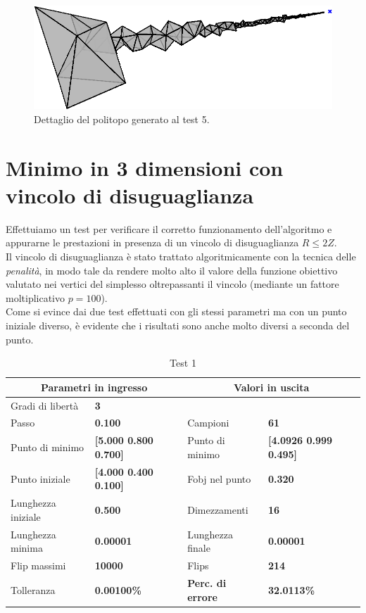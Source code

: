 \documentclass[a4paper, 11pt]{article}
\begin{document}
\begin{figure}[H]
    \centering
        \includegraphics[width=14cm]{assets/figure6}
        \caption{Dettaglio del politopo generato al test 5.}
\end{figure}
\noindent

\newpage
\section{Minimo in 3 dimensioni con vincolo di disuguaglianza}

Effettuiamo un test per verificare il corretto funzionamento dell'algoritmo e
appurarne le prestazioni in presenza di un vincolo di disuguaglianza $R \le 2Z$.
\\
Il vincolo di disuguaglianza è stato trattato algoritmicamente con la tecnica
delle \emph{penalità}, in modo tale da rendere molto alto il valore della
funzione obiettivo valutato nei vertici del simplesso oltrepassanti il vincolo
(mediante un fattore moltiplicativo $p = 100$). \\
Come si evince dai due test effettuati con gli stessi parametri ma con un punto
iniziale diverso, è evidente che i risultati sono anche molto diversi a seconda
del punto.

\begin{table}[h]
    \caption{Test 1}
    \begin{center}
    \begin{tabular}{|l|l|l|l|} 
    \hline 
\multicolumn{2}{|c|}{\textbf{Parametri in ingresso}} &
\multicolumn{2}{c|}{\textbf {Valori in uscita}} \\ \hline
Gradi di libertà  & \textbf{3} &  &  \\ \hline 
Passo & \textbf{0.100} & Campioni & \textbf{61} \\ \hline 
Punto di minimo & \textbf{{[}5.000 0.800 0.700{]}} & Punto di minimo &
\textbf{{[}4.0926 0.999 0.495{]}} \\ \hline 
Punto iniziale & \textbf{{[}4.000 0.400 0.100{]}} & Fobj nel punto &
\textbf{0.320} \\ \hline 
Lunghezza iniziale & \textbf{0.500} & Dimezzamenti & \textbf{16} \\ \hline 
Lunghezza minima & \textbf{0.00001} & Lunghezza finale & \textbf{0.00001} \\
\hline
Flip massimi & \textbf{10000} & Flips & \textbf{214} \\ \hline 
Tolleranza & \textbf{0.00100\%} & \textbf{Perc. di errore} & \textbf{32.0113\%}
\\ \hline 
    \end{tabular}
    \end{center}
    \end{table}
\end{document}
